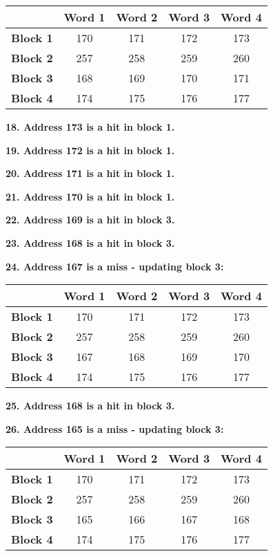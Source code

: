 \documentclass[a4paper, 11pt]{exam}
\begin{document}
\begin{enumerate}
\begin{center}
	\begin{tabular}{ |c|c|c|c|c| } 
		\hline
		&\textbf{Word 1}& \textbf{Word 2}& \textbf{Word 3} & \textbf{Word 4}\\ 
		\hline
		\textbf{Block 1} & 170 & 171  & 172 & 173\\ 
		\hline
		\textbf{Block 2} & 257 & 258  & 259 & 260\\ 
		\hline
		\textbf{Block 3} & 168 &  169 & 170 & 171\\ 
		\hline
		\textbf{Block 4} & 174 & 175  & 176 & 177\\ 
		\hline
	\end{tabular}
\end{center}

\textbf{18. Address 173 is a hit in block 1.}

\textbf{19. Address 172 is a hit in block 1.}

\textbf{20. Address 171 is a hit in block 1.}

\textbf{21. Address 170 is a hit in block 1.}

\textbf{22. Address 169 is a hit in block 3.}

\textbf{23. Address 168 is a hit in block 3.}

\textbf{24. Address 167 is a miss - updating block 3:}

\begin{center}
	\begin{tabular}{ |c|c|c|c|c| } 
		\hline
		&\textbf{Word 1}& \textbf{Word 2}& \textbf{Word 3} & \textbf{Word 4}\\ 
		\hline
		\textbf{Block 1} & 170 & 171  & 172 & 173\\ 
		\hline
		\textbf{Block 2} & 257 & 258  & 259 & 260\\ 
		\hline
		\textbf{Block 3} & 167 &  168 & 169 & 170\\ 
		\hline
		\textbf{Block 4} & 174 & 175  & 176 & 177\\ 
		\hline
	\end{tabular}
\end{center}

\textbf{25. Address 168 is a hit in block 3.}

\textbf{26. Address 165 is a miss - updating block 3:}

\begin{center}
	\begin{tabular}{ |c|c|c|c|c| } 
		\hline
		&\textbf{Word 1}& \textbf{Word 2}& \textbf{Word 3} & \textbf{Word 4}\\ 
		\hline
		\textbf{Block 1} & 170 & 171  & 172 & 173\\ 
		\hline
		\textbf{Block 2} & 257 & 258  & 259 & 260\\ 
		\hline
		\textbf{Block 3} & 165 &  166 & 167 & 168\\ 
		\hline
		\textbf{Block 4} & 174 & 175  & 176 & 177\\ 
		\hline
	\end{tabular}
\end{center}


\end{enumerate}
\end{document}
